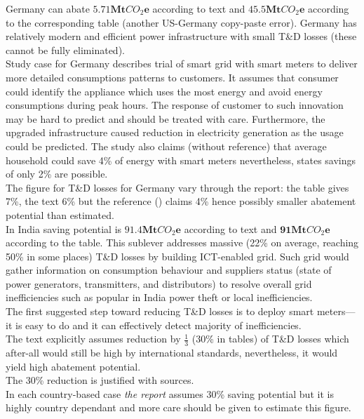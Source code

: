 \documentclass[11pt, twocolumn]{article}
\begin{document}
Germany can abate $\mathbf{5.71} \mathbf{Mt}CO_2\mathbf{e}$ according to text and $\mathbf{45.5} \mathbf{Mt}CO_2\mathbf{e}$ according to the corresponding table (another US-Germany copy-paste error). Germany has relatively modern and efficient power infrastructure with small T\&D losses (these cannot be fully eliminated).\\
Study case for Germany describes trial of smart grid with smart meters to deliver more detailed consumptions patterns to customers. It assumes that consumer could identify the appliance which uses the most energy and avoid energy consumptions during peak hours. The response of customer to such innovation may be hard to predict and should be treated with care. Furthermore, the upgraded infrastructure caused reduction in electricity generation as the usage could be predicted. The study also claims (without reference) that average household could save 4\% of energy with smart meters nevertheless, \citep{bbc:smartmeters} states savings of only 2\% are possible.\\
The figure for T\&D losses for Germany vary through the report: the table gives 7\%, the text 6\% but the reference (\citep{teri:td}) claims 4\% hence possibly smaller abatement potential than estimated.\\

In India saving potential is $\mathbf{91.4} \mathbf{Mt}CO_2\mathbf{e}$ according to text and $\mathbf{91} \mathbf{Mt}CO_2\mathbf{e}$ according to the table. This sublever addresses massive (22\% on average, reaching 50\% in some places) T\&D losses by building ICT-enabled grid. Such grid would gather information on consumption behaviour and suppliers status (state of power generators, transmitters, and distributors) to resolve overall grid inefficiencies such as popular in India power theft or local inefficiencies.\\
The first suggested step toward reducing T\&D losses is to deploy smart meters---it is easy to do and it can effectively detect majority of inefficiencies.\\
The text explicitly assumes reduction by $\frac{1}{3}$ (30\% in tables) of T\&D losses which after-all would still be high by international standards, nevertheless, it would yield high abatement potential.\\
The 30\% reduction is justified with sources.\\

In each country-based case \emph{the report} assumes 30\% saving potential but it is highly country dependant and more care should be given to estimate this figure.\\
\end{document}
